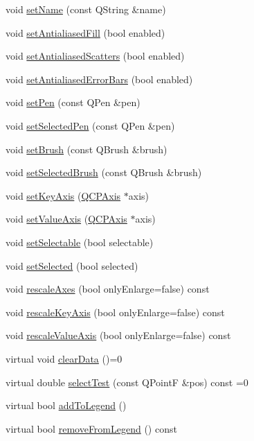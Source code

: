 \begin{DoxyCompactItemize}
\item 
void \hyperlink{classQCPAbstractPlottable_ab79c7ba76bc7fa89a4b3580e12149f1f}{set\-Name} (const Q\-String \&name)
\item 
void \hyperlink{classQCPAbstractPlottable_a089d6b5577120239b55c39ed27c39536}{set\-Antialiased\-Fill} (bool enabled)
\item 
void \hyperlink{classQCPAbstractPlottable_a2f03f067ede2ed4da6f7d0e4777a3f02}{set\-Antialiased\-Scatters} (bool enabled)
\item 
void \hyperlink{classQCPAbstractPlottable_a757beb744b96cf1855cca5ab9d3ecf52}{set\-Antialiased\-Error\-Bars} (bool enabled)
\item 
void \hyperlink{classQCPAbstractPlottable_ab74b09ae4c0e7e13142fe4b5bf46cac7}{set\-Pen} (const Q\-Pen \&pen)
\item 
void \hyperlink{classQCPAbstractPlottable_a6911603cad23ab0469b108224517516f}{set\-Selected\-Pen} (const Q\-Pen \&pen)
\item 
void \hyperlink{classQCPAbstractPlottable_a7a4b92144dca6453a1f0f210e27edc74}{set\-Brush} (const Q\-Brush \&brush)
\item 
void \hyperlink{classQCPAbstractPlottable_ae8c816874089f7a44001e8618e81a9dc}{set\-Selected\-Brush} (const Q\-Brush \&brush)
\item 
void \hyperlink{classQCPAbstractPlottable_a8524fa2994c63c0913ebd9bb2ffa3920}{set\-Key\-Axis} (\hyperlink{classQCPAxis}{Q\-C\-P\-Axis} $\ast$axis)
\item 
void \hyperlink{classQCPAbstractPlottable_a71626a07367e241ec62ad2c34baf21cb}{set\-Value\-Axis} (\hyperlink{classQCPAxis}{Q\-C\-P\-Axis} $\ast$axis)
\item 
void \hyperlink{classQCPAbstractPlottable_a22c69299eb5569e0f6bf084877a37dc4}{set\-Selectable} (bool selectable)
\item 
void \hyperlink{classQCPAbstractPlottable_afbd5428c2952f59d952e11ab5cd79176}{set\-Selected} (bool selected)
\item 
void \hyperlink{classQCPAbstractPlottable_a7e8fc3be43c27ccacd70a7bf9d74a5cd}{rescale\-Axes} (bool only\-Enlarge=false) const 
\item 
void \hyperlink{classQCPAbstractPlottable_a1acecfcca3e7fcda00fcbaa3c886386f}{rescale\-Key\-Axis} (bool only\-Enlarge=false) const 
\item 
void \hyperlink{classQCPAbstractPlottable_abfd0805eb1d955c0111a990246658324}{rescale\-Value\-Axis} (bool only\-Enlarge=false) const 
\item 
virtual void \hyperlink{classQCPAbstractPlottable_a86e5b8fd4b6ff4f4084e7ea4c573fc53}{clear\-Data} ()=0
\item 
virtual double \hyperlink{classQCPAbstractPlottable_a0fd218d6c4974b6ab05bd2f688818556}{select\-Test} (const Q\-Point\-F \&pos) const =0
\item 
virtual bool \hyperlink{classQCPAbstractPlottable_a70f8cabfd808f7d5204b9f18c45c13f5}{add\-To\-Legend} ()
\item 
virtual bool \hyperlink{classQCPAbstractPlottable_aa1f350e510326d012b9a9c9249736c83}{remove\-From\-Legend} () const 
\end{DoxyCompactItemize}
